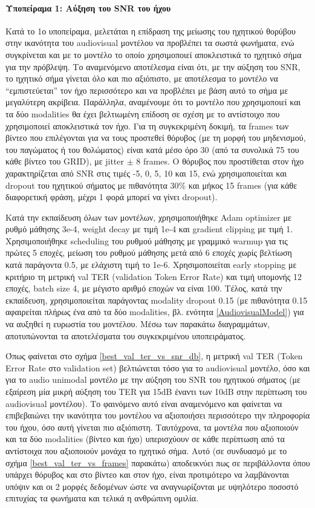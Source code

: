 \paragraph{Υποπείραμα 1: Αύξηση του SNR του ήχου}
\label{SNRExperiment}

Κατά το 1ο υποπείραμα, μελετάται η επίδραση της μείωσης του ηχητικού θορύβου στην ικανότητα του audiovisual μοντέλου να προβλέπει τα σωστά φωνήματα, ενώ συγκρίνεται και με το μοντέλο το οποίο χρησιμοποιεί αποκλειστικά το ηχητικό σήμα για την πρόβλεψη. Το αναμενόμενο αποτέλεσμα είναι ότι, με την αύξηση του SNR, το ηχητικό σήμα γίνεται όλο και πιο αξιόπιστο, με αποτέλεσμα το μοντέλο να ``εμπιστεύεται'' τον ήχο περισσότερο και να προβλέπει με βάση αυτό το σήμα με μεγαλύτερη ακρίβεια. Παράλληλα, αναμένουμε ότι το μοντέλο που χρησιμοποιεί και τα δύο modalities θα έχει βελτιωμένη επίδοση σε σχέση με το αντίστοιχο που χρησιμοποιεί αποκλειστικά τον ήχο. Για τη συγκεκριμένη δοκιμή, τα frames των βίντεο που επιλέγονται για να τους προστεθεί θόρυβος (με τη μορφή του μηδενισμού, του παγώματος ή του θολώματος) είναι κατά μέσο όρο 30 (από τα συνολικά 75 του κάθε βίντεο του GRID), με jitter $\pm$ 8 frames. Ο θόρυβος που προστίθεται στον ήχο χαρακτηρίζεται από SNR στις τιμές -5, 0, 5, 10 και 15, ενώ χρησιμοποιείται και dropout του ηχητικού σήματος με πιθανότητα 30\% και μήκος 15 frames (για κάθε διαφορετική φράση, μέχρι 1 φορά μπορεί να γίνει dropout).

Κατά την εκπαίδευση όλων των μοντέλων, χρησιμοποιήθηκε Adam optimizer με ρυθμό μάθησης 3e-4, weight decay με τιμή 1e-4 και gradient clipping με τιμή 1. Χρησιμοποιήθηκε scheduling του ρυθμού μάθησης με γραμμικό warmup για τις πρώτες 5 εποχές, μείωση του ρυθμού μάθησης μετά από 6 εποχές χωρίς βελτίωση κατά παράγοντα 0.5, με ελάχιστη τιμή το 1e-6.  Χρησιμοποιείται early stopping με κριτήριο τη μετρική val TER (validation Token Error Rate) και τιμή υπομονής 12 εποχές, batch size 4, με μέγιστο αριθμό εποχών να είναι 100. Τέλος, κατά την εκπαίδευση, χρησιμοποιείται παράγοντας modality dropout 0.15 (με πιθανότητα 0.15 αφαιρείται πλήρως ένα από τα δύο modalities, βλ. ενότητα \ref{AudiovisualModel}) για να αυξηθεί η ευρωστία του μοντέλου. Μέσω των παρακάτω διαγραμμάτων, αποτυπώνονται τα αποτελέσματα του συγκεκριμένου υποπειράματος.

Όπως φαίνεται στο σχήμα \ref{best_val_ter_vs_snr_db}, η μετρική val TER (Token Error Rate στο validation set) βελτιώνεται τόσο για το audiovisual μοντέλο, όσο και για το audio unimodal μοντέλο με την αύξηση του SNR του ηχητικού σήματος (με εξαίρεση μία μικρή αύξηση του TER για 15dB έναντι των 10dB στην περίπτωση του audiovisual μοντέλου). Το φαινόμενο αυτό είναι αναμενόμενο και φαίνεται να επιβεβαιώνει την ικανότητα του μοντέλου να αξιοποιήσει περισσότερο την πληροφορία του ήχου, όσο αυτή γίνεται πιο αξιόπιστη. Ταυτόχρονα, τα μοντέλα που αξιοποιούν και τα δύο modalities (βίντεο και ήχο) υπερισχύουν σε κάθε περίπτωση από τα αντίστοιχα που αξιοποιούν μονάχα το ηχητικό σήμα. Αυτό (σε συνδυασμό με το σχήμα \ref{best_val_ter_vs_frames} παρακάτω) αποδεικνύει πως σε περιβάλλοντα όπου υπάρχει θόρυβος και στο βίντεο και στον ήχο, είναι προτιμότερο να λαμβάνονται υπόψιν και οι 2 μορφές δεδομένων ώστε να αναγνωρίζονται με υψηλότερο ποσοστό επιτυχίας τα φωνήματα και τελικά η ανθρώπινη ομιλία.


